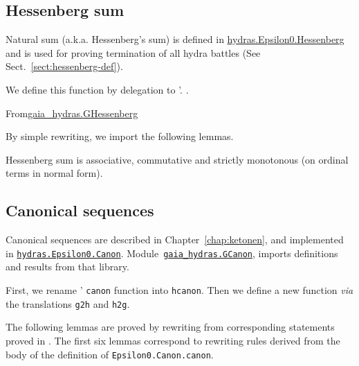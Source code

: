  


\subsection{Hessenberg sum}

Natural sum  (a.k.a. Hessenberg's  sum) is defined in
\href{../theories/html/hydras.Epsilon0.Hessenberg.html}{hydras.Epsilon0.Hessenberg} and is used for proving termination of all hydra battles (See Sect.~\ref{sect:hessenberg-def}).

We define this function by delegation to \HydrasLib'.
\vspace{4pt} 
\noindent.

From\href{../theories/html/gaia\_hydras.GHessenberg.html}{gaia\_hydras.GHessenberg}


By simple rewriting, we import the following lemmas.



Hessenberg sum is associative, commutative and strictly monotonous (on ordinal terms in normal form).







\subsection{Canonical sequences}
Canonical sequences are described in Chapter~\vref{chap:ketonen}, and implemented in
\href{../theories/html/hydras.Epsilon0.Canon.html}%
{\texttt{hydras.Epsilon0.Canon}}.
Module~\href{../theories/html/gaia_hydras.GCanon.html}%
{\texttt{gaia\_hydras.GCanon}}, imports definitions and results from that library.



First, we rename \HydrasLib' \texttt{canon} function into
\texttt{hcanon}. Then we define a new function \emph{via} the
translations \texttt{g2h} and \texttt{h2g}.




The following lemmas are proved by rewriting from corresponding statements proved in \HydrasLib. The first six lemmas correspond to rewriting rules derived from the body of the definition of \texttt{Epsilon0.Canon.canon}.




